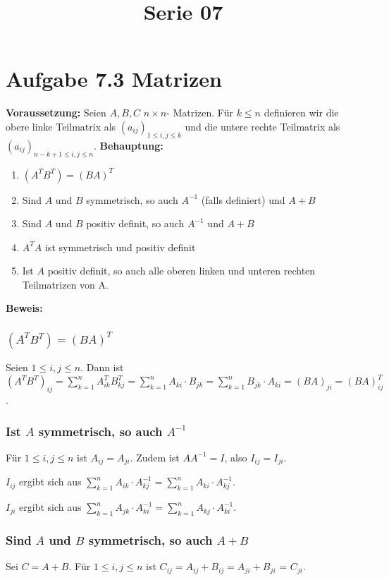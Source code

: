  
\title{Serie 07}

 

  \section*{Aufgabe 7.3 Matrizen}
  \textbf{Voraussetzung: } Seien $A,B,C$ $n \times n$- Matrizen. Für $k \leq n$ definieren wir die obere linke Teilmatrix als $(a_{ij})_{1 \leq i,j \leq k}$ und die untere rechte Teilmatrix als $(a_{ij})_{n-k+1 \leq i,j \leq n}$.  
  \noindent
  \textbf{Behauptung: } 
  \begin{enumerate}
    \item $(A^TB^T) = (BA)^T$
    \item Sind $A$ und $B$ symmetrisch, so auch $A^{-1}$ (falls definiert) und $A+B$
    \item Sind $A$ und $B$ positiv definit, so auch $A^{-1}$ und $A+B$
    \item $A^TA$ ist symmetrisch und positiv definit
    \item Ist $A$ positiv definit, so auch alle oberen linken und unteren rechten Teilmatrizen von A.
  \end{enumerate}

  \noindent
  \textbf{Beweis: }
  
  \subsubsection*{$(A^TB^T) = (BA)^T$}
  
  Seien $1 \leq i,j \leq n$. Dann ist $(A^TB^T)_{ij} = \sum^{n}_{k=1} A^T_{ik} B^T_{kj} = \sum^{n}_{k=1} A_{ki} \cdot B_{jk}  = \sum^{n}_{k=1} B_{jk} \cdot A_{ki} = (BA)_{ji} = (BA)^T_{ij}$.

  \subsubsection*{Ist $A$ symmetrisch, so auch $A^{-1}$}
  Für $1 \leq i,j \leq n$ ist $A_{ij} =  A_{ji}$. Zudem ist $AA^{-1} = I$, also $I_{ij} = I_{ji}$. 
  
  $I_{ij}$ ergibt sich aus $\sum^{n}_{k=1} A_{ik} \cdot A^{-1}_{kj} = \sum^{n}_{k=1} A_{ki} \cdot A^{-1}_{kj}$.
  
  $I_{ji}$ ergibt sich aus $\sum^{n}_{k=1} A_{jk} \cdot A^{-1}_{ki} = \sum^{n}_{k=1} A_{kj} \cdot A^{-1}_{ki}$.
  
  \subsubsection*{Sind $A$ und $B$ symmetrisch, so auch $A+B$}
  
  Sei $C = A + B$. Für $1 \leq i,j \leq n$ ist $C_{ij} = A_{ij} + B_{ij} = A_{ji} + B_{ji}$ = $C_{ji}$.
  
  
  
